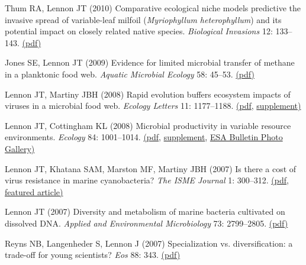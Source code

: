\documentclass[11pt]{article}
\begin{document}
\begin{etaremune}
\item Thum RA, Lennon JT (2010) Comparative ecological niche models predictive the invasive spread of variable-leaf milfoil (\textit{Myriophyllum heterophyllum}) and its potential impact on closely related native species. \textit{Biological Invasions} 12: 133–143. \href{https://lennonlab.github.io/assets/publications/Thum_Lennon_2010.pdf}{(pdf)}

\item Jones SE, Lennon JT (2009) Evidence for limited microbial transfer of methane in a planktonic food web. \textit{Aquatic Microbial Ecology} 58: 45–53. \href{https://lennonlab.github.io/assets/publications/Jones_Lennon_2009.pdf}{(pdf)}

\item Lennon JT, Martiny JBH (2008) Rapid evolution buffers ecosystem impacts of viruses in a microbial food web. \textit{Ecology Letters} 11: 1177–1188. \href{https://lennonlab.github.io/assets/publications/Lennon_Martiny_2008.pdf}{(pdf}, \href{https://lennonlab.github.io/assets/publications/Lennon_Martiny_2008_Suppl.pdf}{supplement)}

\item Lennon JT, Cottingham KL (2008) Microbial productivity in variable resource environments. \textit{Ecology} 84: 1001–1014. \href{https://lennonlab.github.io/assets/publications/Lennon_Cottingham_2008.pdf}{(pdf}, \href{https://lennonlab.github.io/assets/publications/Lennon_Cottingham_2008_Suppl.pdf}{supplement}, \href{https://lennonlab.github.io/assets/publications/Lennon_Cottingham_2008_ESABull.pdf}{ESA Bulletin Photo Gallery)}

\item Lennon JT, Khatana SAM, Marston MF, Martiny JBH (2007) Is there a cost of virus resistance in marine cyanobacteria? \textit{The ISME Journal} 1: 300–312. \href{https://lennonlab.github.io/assets/publications/Lennon_etal_2007.pdf}{(pdf}, \href{https://lennonlab.github.io/assets/publications/Lennon_etal_2007_ISMECov.jpg}{featured article)}

\item Lennon JT (2007) Diversity and metabolism of marine bacteria cultivated on dissolved DNA. \textit{Applied and Environmental Microbiology} 73: 2799–2805. \href{https://lennonlab.github.io/assets/publications/Lennon_2007.pdf}{(pdf)}

\item Reyns NB, Langenheder S, Lennon J (2007) Specialization vs. diversification: a trade-off for young scientists? \textit{Eos} 88: 343. \href{https://lennonlab.github.io/assets/publications/Reyns_etal_2007.pdf}{(pdf)}


\end{etaremune}
\end{document}
